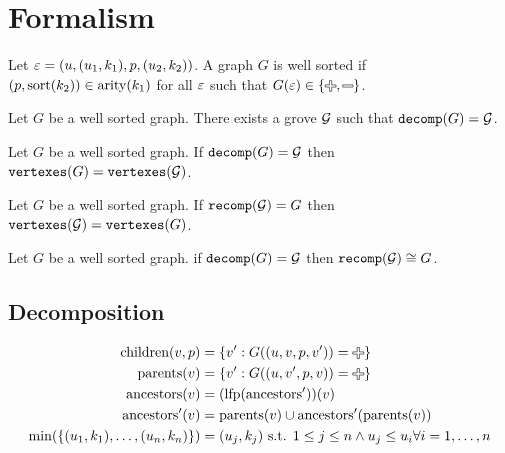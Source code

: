 \section{Formalism}

\begin{definition}
  Let $\varepsilon = (u, (u_1, k_1), p, (u_2, k_2))$.
  A graph $G$ is well sorted if $(p, \operatorname{\text{sort}}(k_2)) \in \operatorname{\text{arity}}(k_1)$
  for all $\varepsilon$ such that $G(\e) \in \{\Plus, \Minus\}$.
\end{definition}

\begin{theorem}
  Let $G$ be a well sorted graph.
  There exists a grove $\mathcal{G}$ such that $\operatorname{\texttt{decomp}}\mathopen{}\left(G\right)\mathclose{} = \mathcal{G}$.
\end{theorem}

\begin{theorem}
  Let $G$ be a well sorted graph.
  If $\operatorname{\texttt{decomp}}\mathopen{}\left(G\right)\mathclose{} = \mathcal{G}$ then $\operatorname{\texttt{vertexes}}\mathopen{}\left(G\right)\mathclose{} = \operatorname{\texttt{vertexes}}\mathopen{}\left(\mathcal{G}\right)\mathclose{}$.
\end{theorem}

\begin{theorem}
  Let $G$ be a well sorted graph.
  If $\operatorname{\texttt{recomp}}\mathopen{}\left(\mathcal{G}\right)\mathclose{} = G$ then $\operatorname{\texttt{vertexes}}\mathopen{}\left(\mathcal{G}\right)\mathclose{} = \operatorname{\texttt{vertexes}}\mathopen{}\left(G\right)\mathclose{}$.
\end{theorem}

\begin{theorem}
  Let $G$ be a well sorted graph.
  if $\operatorname{\texttt{decomp}}\mathopen{}\left(G\right)\mathclose{} = \mathcal{G}$ then $\operatorname{\texttt{recomp}}\mathopen{}\left(\mathcal{G}\right)\mathclose{} \cong G$.
\end{theorem}


\subsection{Decomposition}

\begin{align*}
  \children(v, p) &= \SetOf{v' \SuchThat{G((u, v, p, v')) = \Plus}} \\
  \parents(v) &= \SetOf{v' \SuchThat{G((u, v', p, v)) = \Plus}} \\
  \ancestors(v) &= \mathopen{}\left( \lfp(\ancestors') \right)\mathclose{}(v) \\
  \ancestors'(v) &= \parents(v) \cup \ancestors'(\parents(v)) \\
  \min\mathopen{}\left(\SetOf{(u_1, k_1), \ldots, (u_n, k_n)}\right)\mathclose{} &= (u_j, k_j) \text{ s.t. } 1 \leq j \leq n \land u_j \le u_i \forall i = 1, \ldots, n
\end{align*}

